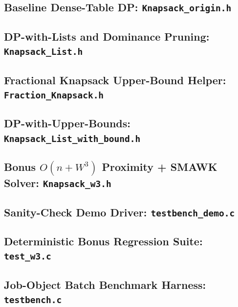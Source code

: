 \documentclass[10pt, a4paper]{article}
\begin{document}
\subsection{Baseline Dense-Table DP: \texttt{Knapsack\_origin.h}}


\subsection{DP-with-Lists and Dominance Pruning: \texttt{Knapsack\_List.h}}


\subsection{Fractional Knapsack Upper-Bound Helper: \texttt{Fraction\_Knapsack.h}}


\subsection{DP-with-Upper-Bounds: \texttt{Knapsack\_List\_with\_bound.h}}


\subsection{Bonus \texorpdfstring{$O(n + W^3)$}{O(n + W3)} Proximity + SMAWK Solver: \texttt{Knapsack\_w3.h}}


\subsection{Sanity-Check Demo Driver: \texttt{testbench\_demo.c}}


\subsection{Deterministic Bonus Regression Suite: \texttt{test\_w3.c}}


\subsection{Job-Object Batch Benchmark Harness: \texttt{testbench.c}}

\end{document}
